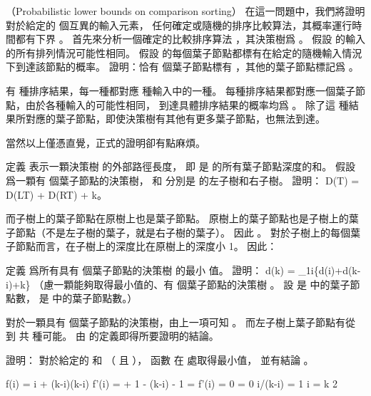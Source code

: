 \startsubject[
  title={Problems},
]

\startPROBLEM
（Probabilistic lower bounds on comparison sorting）
在這一問題中，我們將證明對於給定的  個互異的輸入元素，
任何確定或隨機的排序比較算法，其概率運行時間都有下界 。
首先來分析一個確定的比較排序算法 ，其決策樹爲 。
假設  的輸入的所有排列情況可能性相同。
\startigBase[a]
\startitem
假設  的每個葉子節點都標有在給定的隨機輸入情況下到達該節點的概率。
證明：恰有  個葉子節點標有 ，其他的葉子節點標記爲 。
\stopitem

\startANSWER
有  種排序結果，每一種都對應  種輸入中的一種。
每種排序結果都對應一個葉子節點，由於各種輸入的可能性相同，
到達具體排序結果的概率均爲 。
除了這  種結果所對應的葉子節點，即使決策樹有其他有更多葉子節點，也無法到達。

當然以上僅憑直覺，正式的證明卻有點麻煩。
\stopANSWER

\startitem
定義  表示一顆決策樹  的外部路徑長度，
即  是  的所有葉子節點深度的和。
假設  爲一顆有  個葉子節點的決策樹，
  和  分別是  的左子樹和右子樹。
證明：
\startformula
D(T) = D(LT) + D(RT) + k。
\stopformula
\stopitem

\startANSWER
而子樹上的葉子節點在原樹上也是葉子節點。
原樹上的葉子節點也是子樹上的葉子節點（不是左子樹的葉子，就是右子樹的葉子）。
因此 。
對於子樹上的每個葉子節點而言，在子樹上的深度比在原樹上的深度小 1。
因此：
\startformula
{}
\stopformula
\stopANSWER

\startitem
定義  爲所有具有  個葉子節點的決策樹  的最小  值。
證明：
\startformula
d(k) = \min_{1\le i}\left\{d(i)+d(k-i)+k\right\}
\stopformula
（\hint 慮一顆能夠取得最小值的、有  個葉子節點的決策樹 。
設  是  中的葉子節點數，  是  中的葉子節點數。）
\stopitem

\startANSWER
對於一顆具有  個葉子節點的決策樹，由上一項可知 。
而左子樹上葉子節點有從  到  共  種可能。
由  的定義即得所要證明的結論。
\stopANSWER

\startitem
證明：  對於給定的  和  （ 且 ），
函數  在  處取得最小值，
並有結論 。
\stopitem

\startANSWER
\startformula\startmathalignment
\NC f(i) \NC= i + (k-i)\lg(k-i) \NR
\NC f'(i) \NC=  + 1 - \lg(k-i) - 1 = \lg{} \NR
\NC f'(i) = 0 \NC \Leftrightarrow \lg{} = 0 \Rightarrow i/(k-i) = 1 \Rightarrow i = \frac k 2 \NR
\stopmathalignment\stopformula

